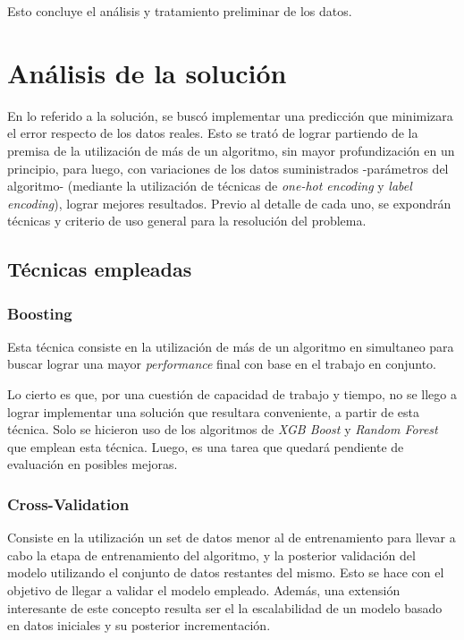 \documentclass[titlepage,a4paper,11pt]{article}
\begin{document}
Esto concluye el análisis y tratamiento preliminar de los datos. 

\section{Análisis de la solución}
En lo referido a la solución, se buscó implementar una predicción que minimizara el error respecto de los datos reales. Esto se trató de lograr partiendo de la premisa de la utilización de más de un algoritmo, sin mayor profundización en un principio, para luego, con variaciones de los datos suministrados -parámetros del algoritmo- (mediante la utilización de técnicas de \textit{one-hot encoding} y \textit{label encoding}), lograr mejores resultados. Previo al detalle de cada uno, se expondrán técnicas y criterio de uso general para la resolución del problema.

\subsection{Técnicas empleadas}

\subsubsection{Boosting}
Esta técnica consiste en la utilización de más de un algoritmo en simultaneo para buscar lograr una mayor \textit{performance} final con base en el trabajo en conjunto.

Lo cierto es que, por una cuestión de capacidad de trabajo y tiempo, no se llego a lograr implementar una solución que resultara conveniente, a partir de esta técnica. Solo se hicieron uso de los algoritmos de \textit{XGB Boost} y \textit{Random Forest} que emplean esta técnica. Luego, es una tarea que quedará pendiente de evaluación en posibles mejoras.

\subsubsection{Cross-Validation}
Consiste en la utilización un set de datos menor al de entrenamiento para llevar a cabo la etapa de entrenamiento del algoritmo, y la posterior validación del modelo utilizando el conjunto de datos restantes del mismo. Esto se hace con el objetivo de llegar a validar el modelo empleado. Además, una extensión interesante de este concepto resulta ser el la escalabilidad de un modelo basado en datos iniciales y su posterior incrementación.
\end{document}
